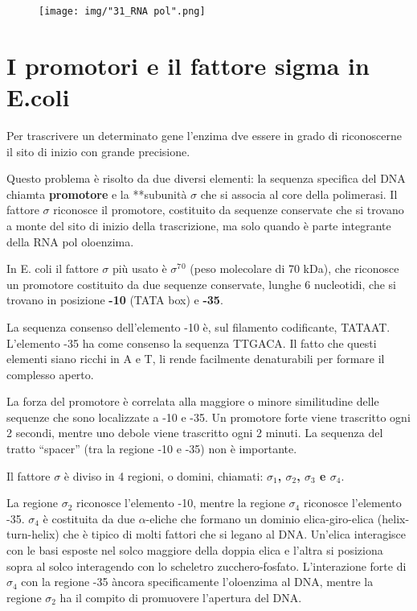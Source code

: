 \documentclass[11pt]{book}
\begin{document}
\begin{figure}[htp]
\centering
\texttt{[image: img/"31\_RNA pol".png]}
\caption{}
\label{rna-pol}
\end{figure}

\section{I promotori e il fattore sigma in
E.coli}\label{i-promotori-e-il-fattore-sigma-in-e.coli}

Per trascrivere un determinato gene l'enzima dve essere in grado di
riconoscerne il sito di inizio con grande precisione.

Questo problema è risolto da due diversi elementi: la sequenza specifica
del DNA chiamta \textbf{promotore} e la **subunità \(\sigma\) che si
associa al core della polimerasi. Il fattore \(\sigma\) riconosce il
promotore, costituito da sequenze conservate che si trovano a monte del
sito di inizio della trascrizione, ma solo quando è parte integrante
della RNA pol oloenzima.

In E. coli il fattore \(\sigma\) più usato è \(\sigma\)\(^7\)\(^0\)
(peso molecolare di 70 kDa), che riconosce un promotore costituito da
due sequenze conservate, lunghe 6 nucleotidi, che si trovano in
posizione \textbf{-10} (TATA box) e \textbf{-35}.

La sequenza consenso dell'elemento -10 è, sul filamento codificante,
TATAAT. L'elemento -35 ha come consenso la sequenza TTGACA. Il fatto che
questi elementi siano ricchi in A e T, li rende facilmente denaturabili
per formare il complesso aperto.

La forza del promotore è correlata alla maggiore o minore similitudine
delle sequenze che sono localizzate a -10 e -35. Un promotore forte
viene trascritto ogni 2 secondi, mentre uno debole viene trascritto ogni
2 minuti. La sequenza del tratto ``spacer'' (tra la regione -10 e -35)
non è importante.

Il fattore \(\sigma\) è diviso in 4 regioni, o domini, chiamati:
\textbf{\(\sigma\)\(_1\), \(\sigma\)\(_2\), \(\sigma\)\(_3\) e
\(\sigma\)\(_4\)}.

La regione \(\sigma\)\(_2\) riconosce l'elemento -10, mentre la regione
\(\sigma\)\(_4\) riconosce l'elemento -35. \(\sigma\)\(_4\) è costituita
da due \(\alpha\)-eliche che formano un dominio elica-giro-elica
(helix-turn-helix) che è tipico di molti fattori che si legano al DNA.
Un'elica interagisce con le basi esposte nel solco maggiore della doppia
elica e l'altra si posiziona sopra al solco interagendo con lo scheletro
zucchero-fosfato. L'interazione forte di \(\sigma\)\(_4\) con la regione
-35 àncora specificamente l'oloenzima al DNA, mentre la regione
\(\sigma\)\(_2\) ha il compito di promuovere l'apertura del DNA.
\end{document}
